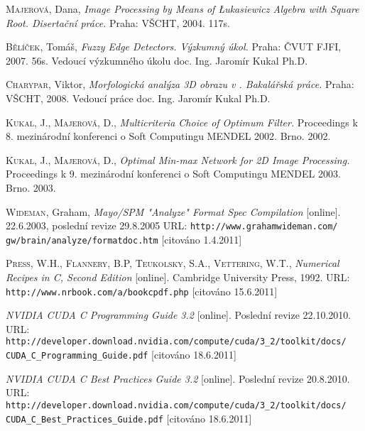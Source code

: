 \begin{thebibliography}{99}
        \textsc{Majerová}, Dana, \textit{Image Processing by Means of \L ukasiewicz Algebra with Square Root.
        Disertační práce.} Praha: VŠCHT, 2004. 117s.

         \textsc{Bělíček}, Tomáš, \textit{Fuzzy Edge Detectors.
        Výzkumný úkol.} Praha: ČVUT FJFI, 2007. 56s. Vedoucí výzkumného úkolu doc. Ing. Jaromír Kukal Ph.D.

         \textsc{Charypar}, Viktor, \textit{Morfologická analýza 3D obrazu v \Cpp.
        Bakalářská práce.} Praha: VŠCHT, 2008. Vedoucí práce doc. Ing. Jaromír Kukal Ph.D.

        \textsc{Kukal}, J., \textsc{Majerová}, D., \textit{Multicriteria Choice of Optimum Filter.
        } Proceedings k 8. mezinárodní konferenci o Soft Computingu MENDEL 2002. Brno. 2002.

        \textsc{Kukal}, J., \textsc{Majerová}, D., \textit{Optimal Min-max Network for 2D Image Processing.
        } Proceedings k 9. mezinárodní konferenci o Soft Computingu MENDEL 2003. Brno. 2003.

        \textsc{Wideman}, Graham, \textit{Mayo/SPM "Analyze" Format Spec Compilation} [online]. 22.6.2003, poslední revize 29.8.2005
        URL: \texttt{http://www.grahamwideman.com/} {\tt gw/brain/analyze/formatdoc.htm} [citováno 1.4.2011]

        \textsc{Press}, W.H., \textsc{Flannery}, B.P, \textsc{Teukolsky}, S.A., \textsc{Vettering}, W.T.,
        \textit{Numerical Recipes in C, Second Edition} [online]. Cambridge University Press, 1992.
        URL: {\tt http://www.nrbook.com/a/bookcpdf.php} [citováno 15.6.2011]

        \textit{NVIDIA CUDA C Programming Guide 3.2} [online]. Poslední revize 22.10.2010.
        URL: {\tt http://developer.download.nvidia.com/compute/cuda/3\_2/toolkit/docs/} {\tt CUDA\_C\_Programming\_Guide.pdf} [citováno 18.6.2011]

        \textit{NVIDIA CUDA C Best Practices Guide 3.2} [online]. Poslední revize 20.8.2010.
        URL: {\tt  http://developer.download.nvidia.com/compute/cuda/3\_2/toolkit/docs/} {\tt CUDA\_C\_Best\_Practices\_Guide.pdf} [citováno 18.6.2011]


\end{thebibliography}
